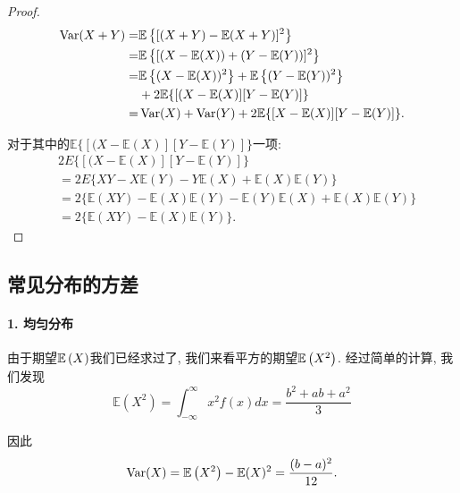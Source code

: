    \begin{proof}
    $$
\begin{aligned}
\operatorname{Var}(X+Y)= & \mathbb E\left\{[(X+Y)-\mathbb E(X+Y)]^2\right\} \\
= & \mathbb E\left\{[(X-\mathbb E(X))+(Y-\mathbb E(Y))]^2\right\} \\
= & \mathbb E\left\{(X-\mathbb E(X))^2\right\}+\mathbb E\left\{(Y-\mathbb E(Y))^2\right\} \\
& +2 \mathbb E\{[(X-\mathbb E(X)][Y-\mathbb E(Y)]\} \\
= & \operatorname{Var}(X)+\operatorname{Var}(Y)+2 \mathbb E\{[X-\mathbb E(X)][Y-\mathbb E(Y)]\} .\\
\end{aligned}
$$

对于其中的$ \mathbb E\{[(X-\mathbb E(X)][Y-\mathbb E(Y)]\}$一项: $$
\begin{aligned}
& 2 E\{[(X-\mathbb E(X)][Y-\mathbb E(Y)]\} \\
& =2 E\{X Y-X \mathbb E(Y)-Y \mathbb E(X)+\mathbb E(X) \mathbb E(Y)\} \\
& =2\{\mathbb E(X Y)-\mathbb E(X) \mathbb E(Y)-\mathbb E(Y) \mathbb E(X)+\mathbb E(X) \mathbb E(Y)\} \\
& =2\{\mathbb E(X Y)-\mathbb E(X) \mathbb E(Y)\} .
\end{aligned}
$$
   \end{proof}

   

    \subsection{常见分布的方差}
    \paragraph{1. 均匀分布} 由于期望$\mathbb E\left(X\right)$我们已经求过了, 我们来看平方的期望$\mathbb E\left(X^2\right)$. 经过简单的计算, 我们发现$$
    \mathbb E\left(X^2\right)=\int_{-\infty}^{\infty} x^2 f(x) d x=\frac{b^2+a b+a^2}{3}
    $$
    
    因此
    $$
    \operatorname{Var}(X)=\mathbb E\left(X^2\right)-\mathbb E(X)^2=\frac{(b-a)^2}{12}.
    $$

